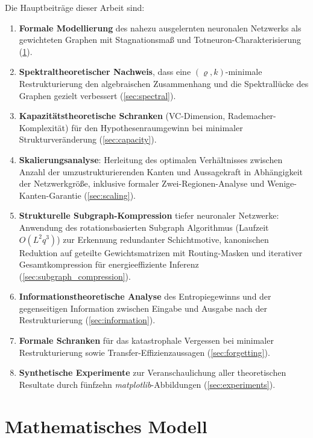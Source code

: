 \documentclass[12pt, a4paper, openany]{report}
\begin{document}
Die Hauptbeiträge dieser Arbeit sind:
\begin{enumerate}[label=(\roman*)]
  \item \textbf{Formale Modellierung} des nahezu ausgelernten neuronalen
    Netzwerks als gewichteten Graphen mit Stagnationsmaß und
    Totneuron-Charakterisierung (\cref{sec:model}).
  \item \textbf{Spektraltheoretischer Nachweis}, dass eine
    $(\varrho,k)$-minimale Restrukturierung den algebraischen
    Zusammenhang und die Spektrallücke des Graphen gezielt verbessert
    (\cref{sec:spectral}).
  \item \textbf{Kapazitätstheoretische Schranken} (VC-Dimension,
    Rademacher-Komplexität) für den Hypothesenraumgewinn bei minimaler
    Strukturveränderung (\cref{sec:capacity}).
  \item \textbf{Skalierungsanalyse}: Herleitung des optimalen Verhältnisses
    zwischen Anzahl der umzustrukturierenden Kanten und Aussagekraft in
    Abhängigkeit der Netzwerkgröße, inklusive formaler Zwei-Regionen-Analyse
    und Wenige-Kanten-Garantie (\cref{sec:scaling}).
  \item \textbf{Strukturelle Subgraph-Kompression} tiefer neuronaler
    Netzwerke: Anwendung des rotationsbasierten Subgraph Algorithmus
    (Laufzeit $O(L^2 q^3)$) zur Erkennung redundanter Schichtmotive,
    kanonischen Reduktion auf geteilte Gewichtsmatrizen mit Routing-Masken
    und iterativer Gesamtkompression für energieeffiziente Inferenz
    (\cref{sec:subgraph_compression}).
  \item \textbf{Informationstheoretische Analyse} des Entropiegewinns
    und der gegenseitigen Information zwischen Eingabe und Ausgabe nach
    der Restrukturierung (\cref{sec:information}).
  \item \textbf{Formale Schranken} für das katastrophale Vergessen bei
    minimaler Restrukturierung sowie Transfer-Effizienzaussagen
    (\cref{sec:forgetting}).
  \item \textbf{Synthetische Experimente} zur Veranschaulichung aller
    theoretischen Resultate durch fünfzehn \textit{matplotlib}-Abbildungen
    (\cref{sec:experiments}).
\end{enumerate}

\chapter{Mathematisches Modell}
\label{sec:model}
\end{document}
